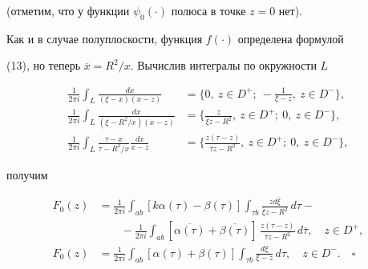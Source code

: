 (отметим, что у функции $\psi_0(\cdot)$ полюса в точке $z=0$ нет).





Как и в случае полуплоскости, функция $f(\cdot)$ определена формулой


(13), но теперь $\overline{x}=R^2/x$. Вычислив интегралы по окружности $L$


\begin{align*}


\frac{1}{2\pi i}\int_{L}


\frac{dx}{(\xi-x)(x-z)} &=


\bigg\{ 0,\ z\in D^+; \ -\frac{1}{\xi-z},\ z\in D^- \bigg\}, \\


%


\frac{1}{2\pi i}\int_{L}


\frac{dx}{(\overline{\xi}-R^2/x)(x-z)} &=


\bigg\{\frac{z}{\overline{\xi}z-R^2},\ z\in D^+;


\ 0,\ z\in D^- \bigg\}, \\


%


\frac{1}{2\pi i}\int_{L}


\frac{\tau-x}{\overline{\tau}-R^2/x}\frac{dx}{x-z} &=


\bigg\{ \frac{z(\tau-z)}{\overline{\tau}z-R^2},\ z\in D^+;


\ 0,\ z\in D^- \bigg\} ,


\end{align*}


получим


\begin{align*}


F_0(z) &=


\frac{1}{2\pi i}\int_{ab} [k\alpha(\tau)-\beta(\tau)]


\int_{\tau b}\frac{zd\overline{\xi}}{\overline{\xi}z-R^2}\,d\tau - \\


%


&\qquad - \frac{1}{2\pi i}\int_{ab} [\overline{\alpha(\tau)}


+\overline{\beta(\tau)}]


 \,\frac{z(\tau-z)}{\overline{\tau}z-R^2}\,d\overline{\tau},


\quad z\in D^+, \\


%


F_0(z) &=


\frac{1}{2\pi i}\int_{ab} [\alpha(\tau)+\beta(\tau)]


\int_{\tau b}\frac{d\xi}{\xi-z}\,d\tau,


\quad z\in D^-. \quad\square


\end{align*}





